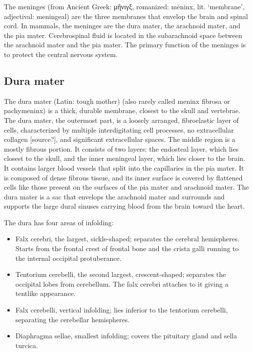 \documentclass[]{book}
\providecommand{\tightlist}{%
  \setlength{\itemsep}{0pt}\setlength{\parskip}{0pt}}
\begin{document}
The meninges (from Ancient Greek: μῆνιγξ, romanized: mēninx, lit. `membrane', adjectival: meningeal) are the three membranes that envelop the brain and spinal cord. In mammals, the meninges are the dura mater, the arachnoid mater, and the pia mater. Cerebrospinal fluid is located in the subarachnoid space between the arachnoid mater and the pia mater. The primary function of the meninges is to protect the central nervous system.

\hypertarget{dura-mater}{%
\subsection{Dura mater}\label{dura-mater}}

The dura mater (Latin: tough mother) (also rarely called meninx fibrosa or pachymeninx) is a thick, durable membrane, closest to the skull and vertebrae. The dura mater, the outermost part, is a loosely arranged, fibroelastic layer of cells, characterized by multiple interdigitating cell processes, no extracellular collagen {[}source?{]}, and significant extracellular spaces. The middle region is a mostly fibrous portion. It consists of two layers: the endosteal layer, which lies closest to the skull, and the inner meningeal layer, which lies closer to the brain. It contains larger blood vessels that split into the capillaries in the pia mater. It is composed of dense fibrous tissue, and its inner surface is covered by flattened cells like those present on the surfaces of the pia mater and arachnoid mater. The dura mater is a sac that envelops the arachnoid mater and surrounds and supports the large dural sinuses carrying blood from the brain toward the heart.

The dura has four areas of infolding:

\begin{itemize}
\tightlist
\item
  Falx cerebri, the largest, sickle-shaped; separates the cerebral hemispheres. Starts from the frontal crest of frontal bone and the crista galli running to the internal occipital protuberance.
\item
  Tentorium cerebelli, the second largest, crescent-shaped; separates the occipital lobes from cerebellum. The falx cerebri attaches to it giving a tentlike appearance.
\item
  Falx cerebelli, vertical infolding; lies inferior to the tentorium cerebelli, separating the cerebellar hemispheres.
\item
  Diaphragma sellae, smallest infolding; covers the pituitary gland and sella turcica.
\end{itemize}
\end{document}
